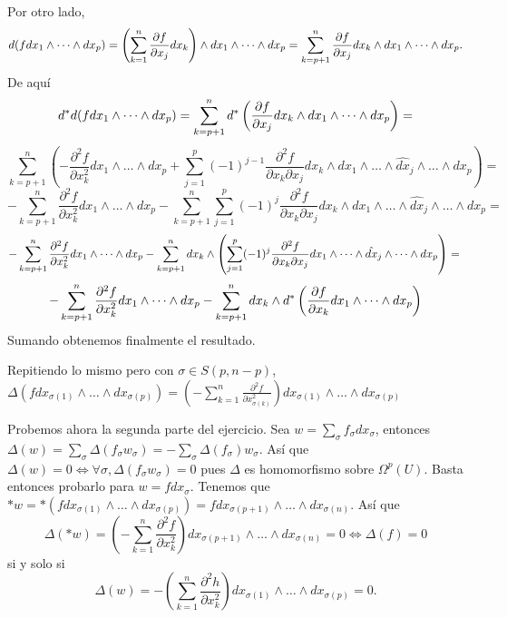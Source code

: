 \documentclass[twoside]{article}
\begin{document}
\begin{solucion}
Por otro lado, $$d(f dx_1\land\dots\land dx_p)=\left(\sum_{k=1}^n\frac{\partial f}{\partial x_j}dx_k\right)\land dx_1\land\dots\land dx_p=\sum_{k=p+1}^n\frac{\partial f}{\partial x_j}dx_k\land dx_1\land\dots\land dx_p.$$
De aquí
\[
d^*d(f dx_1\land\dots\land dx_p)=\sum_{k=p+1}^nd^*\left(\frac{\partial f}{\partial x_j}dx_k\land dx_1\land\dots\land dx_p\right)=
\]
\[
\sum_{k=p+1}^n\left(-\frac{\partial^2 f}{\partial x_k^2}dx_1\land\dots\land dx_p+\sum_{j=1}^p (-1)^{j-1}\frac{\partial^2 f}{\partial x_k\partial x_j}dx_k\land dx_1\land\dots\land\hat{dx}_j\land\dots\land dx_p\right)=
\]
\[
-\sum_{k=p+1}^n\frac{\partial^2 f}{\partial x_k^2}dx_1\land\dots\land dx_p-\sum_{k=p+1}^n\sum_{j=1}^p(-1)^{j}\frac{\partial^2 f}{\partial x_k\partial x_j}dx_k\land dx_1\land\dots\land\hat{dx}_j\land\dots\land dx_p=
\]
\[
-\sum_{k=p+1}^n\frac{\partial^2 f}{\partial x_k^2}dx_1\land\dots\land dx_p-\sum_{k=p+1}^n dx_k\land\left(\sum_{j=1}^p(-1)^{j}\frac{\partial^2 f}{\partial x_k\partial x_j} dx_1\land\dots\land\hat{dx}_j\land\dots\land dx_p\right)=\\
\]
\[
-\sum_{k=p+1}^n\frac{\partial^2 f}{\partial x_k^2}dx_1\land\dots\land dx_p-\sum_{k=p+1}^ndx_k\land d^*\left(\frac{\partial f}{\partial x_k} dx_1\land\dots\land dx_p\right)
\]
Sumando obtenemos finalmente el resultado.
\begin{nota}
Repitiendo lo mismo pero con $\sigma\in S(p,n-p)$, $\Delta(f dx_{\sigma(1)}\land\dots\land dx_{\sigma(p)})=\left(-\sum_{k=1}^n\frac{\partial^2 f}{\partial x_{\sigma(k)}^2}\right) dx_{\sigma(1)}\land\dots\land dx_{\sigma(p)}$
\end{nota}

Probemos ahora la segunda parte del ejercicio.  Sea $w=\sum_{\sigma} f_{\sigma}dx_{\sigma}$, entonces $\Delta(w)=\sum_{\sigma} \Delta(f_{\sigma}w_{\sigma})=-\sum_{\sigma}\Delta(f_{\sigma})w_{\sigma}$. Así que $\Delta(w)=0\Leftrightarrow \forall\sigma, \Delta(f_{\sigma}w_{\sigma})=0$ pues $\Delta$ es homomorfismo sobre $\Omega^p(U)$. Basta entonces probarlo para $w=fdx_{\sigma}$. Tenemos que $*w=*(fdx_{\sigma(1)}\land\dots\land dx_{\sigma(p)})=fdx_{\sigma(p+1)}\land\dots\land dx_{\sigma(n)}$. Así que
\[
\Delta(*w)=\left(-\sum_{k=1}^n\frac{\partial^2 f}{\partial x_k^2}\right)dx_{\sigma(p+1)}\land\dots\land dx_{\sigma(n)}=0\Leftrightarrow \Delta(f)=0
\] 
si y solo si
\[
\Delta(w)=-\left(\sum_{k=1}^n\frac{\partial^2 h}{\partial x_k^2}\right)dx_{\sigma(1)}\land\dots\land dx_{\sigma(p)}=0.
\]
\end{solucion}
\newpage
\end{document}
